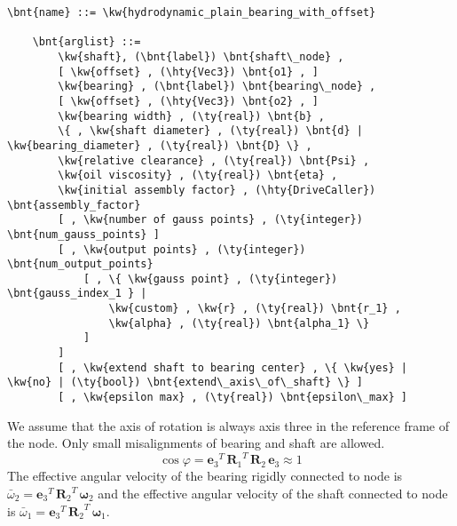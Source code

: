 \begin{Verbatim}[commandchars=\\\{\}]
    \bnt{name} ::= \kw{hydrodynamic_plain_bearing_with_offset}

    \bnt{arglist} ::=
        \kw{shaft}, (\bnt{label}) \bnt{shaft\_node} ,
        [ \kw{offset} , (\hty{Vec3}) \bnt{o1} , ]
        \kw{bearing} , (\bnt{label}) \bnt{bearing\_node} ,
        [ \kw{offset} , (\hty{Vec3}) \bnt{o2} , ]
        \kw{bearing width} , (\ty{real}) \bnt{b} ,
        \{ , \kw{shaft diameter} , (\ty{real}) \bnt{d} | \kw{bearing_diameter} , (\ty{real}) \bnt{D} \} ,
        \kw{relative clearance} , (\ty{real}) \bnt{Psi} ,
        \kw{oil viscosity} , (\ty{real}) \bnt{eta} ,
        \kw{initial assembly factor} , (\hty{DriveCaller}) \bnt{assembly_factor}
        [ , \kw{number of gauss points} , (\ty{integer}) \bnt{num_gauss_points} ]
        [ , \kw{output points} , (\ty{integer}) \bnt{num_output_points} 
            [ , \{ \kw{gauss point} , (\ty{integer}) \bnt{gauss_index_1 } |
                \kw{custom} , \kw{r} , (\ty{real}) \bnt{r_1} , 
                \kw{alpha} , (\ty{real}) \bnt{alpha_1} \}
            ]
        ]
        [ , \kw{extend shaft to bearing center} , \{ \kw{yes} | \kw{no} | (\ty{bool}) \bnt{extend\_axis\_of\_shaft} \} ]
        [ , \kw{epsilon max} , (\ty{real}) \bnt{epsilon\_max} ]
\end{Verbatim}
We assume that the axis of rotation is always axis three in the reference frame of the node. Only small misalignments of bearing and shaft are allowed.
\begin{equation}
\cos{\varphi}={\boldsymbol{e}_{3}}^T \, {\boldsymbol{R}_1}^T \, \boldsymbol{R}_2 \, \boldsymbol{e}_{3} \approx 1
\end{equation}
The effective angular velocity of the bearing rigidly connected to node  is $\bar{\omega}_2={\boldsymbol{e}_{3}}^T\,{\boldsymbol{R}_{2}}^T\,\boldsymbol{\omega}_2$ and the effective angular velocity of the shaft connected to node  is $\bar{\omega}_1={\boldsymbol{e}_{3}}^T\,{\boldsymbol{R}_{2}}^T\,\boldsymbol{\omega}_1$.
